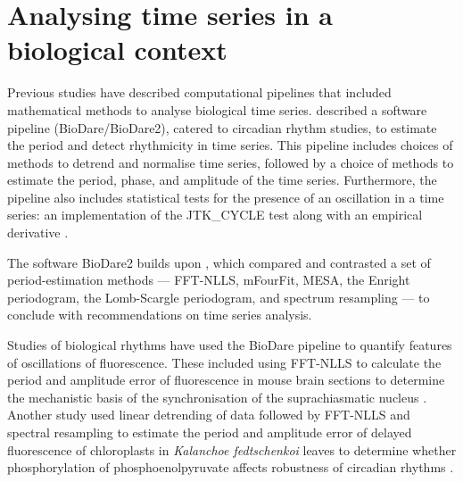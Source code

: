\section{Analysing time series in a biological context}
\label{sec:analysis-literature}

Previous studies have described computational pipelines that included mathematical methods to analyse biological time series.
\textcite{zielinskiPeriodEstimationRhythm2022} described a software pipeline (BioDare/BioDare2), catered to circadian rhythm studies, to estimate the period and detect rhythmicity in time series.
This pipeline includes choices of methods to detrend and normalise time series, followed by a choice of methods to estimate the period, phase, and amplitude of the time series.
Furthermore, the pipeline also includes statistical tests for the presence of an oscillation in a time series: an implementation of the JTK\_CYCLE test \parencite{hughesJTK_CYCLEEfficientNonparametric2010} along with an empirical derivative \parencite{hutchisonImprovedStatisticalMethods2015}.

The software BioDare2 builds upon \textcite{zielinskiStrengthsLimitationsPeriod2014}, which compared and contrasted a set of period-estimation methods ---
FFT-NLLS, mFourFit, MESA, the Enright periodogram, the Lomb-Scargle periodogram, and spectrum resampling --- to conclude with recommendations on time series analysis.

Studies of biological rhythms have used the BioDare pipeline to quantify features of oscillations of fluorescence.
These included using FFT-NLLS to calculate the period and amplitude error of fluorescence in mouse brain sections to determine the mechanistic basis of the synchronisation of the suprachiasmatic nucleus \parencite{hamnettVasoactiveIntestinalPeptide2019}.
Another study used linear detrending of data followed by FFT-NLLS and spectral resampling to estimate the period and amplitude error of delayed fluorescence of chloroplasts in \textit{Kalanchoe fedtschenkoi} leaves to determine whether phosphorylation of phosphoenolpyruvate affects robustness of circadian rhythms \parencite{boxallPhosphorylationPhosphoenolpyruvateCarboxylase2017}.

